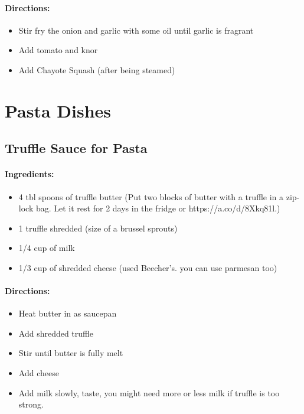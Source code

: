 \documentclass{article}
\begin{document}
\paragraph{Directions:}
\begin{itemize}
    \item Stir fry the onion and garlic with some oil until garlic is fragrant
    \item Add tomato and knor
    \item Add Chayote Squash (after being steamed)
\end{itemize}

\section{Pasta Dishes}


\subsection{Truffle Sauce for Pasta}

\paragraph{Ingredients:}
\begin{itemize}
    \item 4 tbl spoons of truffle butter (Put two blocks of butter with a truffle in a zip-lock bag. Let it rest for 2 days in the fridge or https://a.co/d/8Xkq81l.)
    \item 1 truffle shredded (size of a brussel sprouts)
    \item 1/4 cup of milk
    \item 1/3 cup of shredded cheese (used Beecher's. you can use parmesan too)
\end{itemize}

\paragraph{Directions:}
\begin{itemize}
    \item Heat butter in as saucepan
    \item Add shredded truffle
    \item Stir until butter is fully melt
    \item Add cheese
    \item Add milk slowly, taste, you might need more or less milk if truffle is too strong.
\end{itemize}
\end{document}
